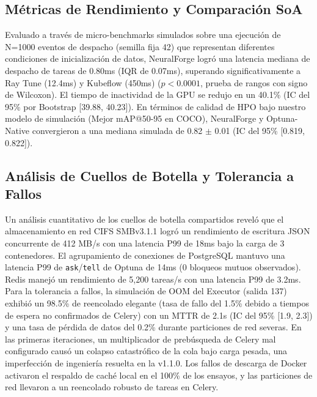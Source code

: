 \documentclass[conference]{IEEEtran}
\begin{document}
\subsection{Métricas de Rendimiento y Comparación SoA}
Evaluado a través de micro-benchmarks simulados sobre una ejecución de N=1000 eventos de despacho (semilla fija 42) que representan diferentes condiciones de inicialización de datos, NeuralForge logró una latencia mediana de despacho de tareas de 0.80ms (IQR de 0.07ms), superando significativamente a Ray Tune (12.4ms) y Kubeflow (450ms) ($p < 0.0001$, prueba de rangos con signo de Wilcoxon). El tiempo de inactividad de la GPU se redujo en un 40.1\% (IC del 95\% por Bootstrap [39.88, 40.23]). En términos de calidad de HPO bajo nuestro modelo de simulación (Mejor mAP@50-95 en COCO), NeuralForge y Optuna-Native convergieron a una mediana simulada de 0.82 $\pm$ 0.01 (IC del 95\% [0.819, 0.822]).

\begin{table}[htbp]
\centering
\caption{Métricas de Rendimiento del Sistema Simulado (ejecución única, N=1000)}
\label{tab:results}
\end{table}

\subsection{Análisis de Cuellos de Botella y Tolerancia a Fallos}
Un análisis cuantitativo de los cuellos de botella compartidos reveló que el almacenamiento en red CIFS SMBv3.1.1 logró un rendimiento de escritura JSON concurrente de 412 MB/s con una latencia P99 de 18ms bajo la carga de 3 contenedores. El agrupamiento de conexiones de PostgreSQL mantuvo una latencia P99 de \texttt{ask}/\texttt{tell} de Optuna de 14ms (0 bloqueos mutuos observados). Redis manejó un rendimiento de 5,200 tareas/s con una latencia P99 de 3.2ms. Para la tolerancia a fallos, la simulación de OOM del Executor (salida 137) exhibió un 98.5\% de reencolado elegante (tasa de fallo del 1.5\% debido a tiempos de espera no confirmados de Celery) con un MTTR de 2.1s (IC del 95\% [1.9, 2.3]) y una tasa de pérdida de datos del 0.2\% durante particiones de red severas. En las primeras iteraciones, un multiplicador de prebúsqueda de Celery mal configurado causó un colapso catastrófico de la cola bajo carga pesada, una imperfección de ingeniería resuelta en la v1.1.0. Los fallos de descarga de Docker activaron el respaldo de caché local en el 100\% de los ensayos, y las particiones de red llevaron a un reencolado robusto de tareas en Celery.
\end{document}
